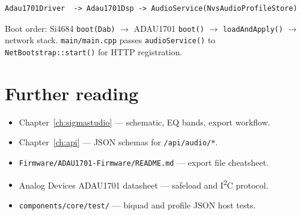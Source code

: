 \begin{verbatim}
Adau1701Driver  -> Adau1701Dsp -> AudioService(NvsAudioProfileStore)
\end{verbatim}

Boot order: Si4684 \texttt{boot(Dab)} $\rightarrow$ ADAU1701 \texttt{boot()}
$\rightarrow$ \texttt{loadAndApply()} $\rightarrow$ network stack.
\texttt{main/main.cpp} passes \texttt{audioService()} to
\texttt{NetBootstrap::start()} for HTTP registration.

\section{Further reading}
\label{sec:adau1701-reading}

\begin{itemize}
  \item Chapter~\ref{ch:sigmastudio} --- schematic, EQ bands, export workflow.
  \item Chapter~\ref{ch:api} --- JSON schemas for \texttt{/api/audio/*}.
  \item \texttt{Firmware/ADAU1701-Firmware/README.md} --- export file cheatsheet.
  \item Analog Devices ADAU1701 datasheet --- safeload and I\textsuperscript{2}C protocol.
  \item \texttt{components/core/test/} --- biquad and profile JSON host tests.
\end{itemize}
